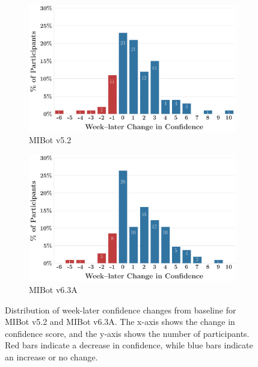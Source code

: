 \begin{figure}[htbp]
    \centering
    \begin{subfigure}[b]{0.48\textwidth}
        \centering
        \includegraphics[width=\textwidth]{fig/MIV5.2_ruler_deltas_delta_with_week_later_keep_high_conf_False_change.png}
        \caption{MIBot v5.2}
        \label{fig:confidence_v5.2}
    \end{subfigure}
    \hfill
    \begin{subfigure}[b]{0.48\textwidth}
        \centering
        \includegraphics[width=\textwidth]{fig/2024-11-14-MIV6.3A-2024-11-22-MIV6.3A_ruler_deltas_delta_with_week_later_keep_high_conf_False_change.png}
        \caption{MIBot v6.3A}
        \label{fig:confidence_v6.3}
    \end{subfigure}

    
    \caption[Confidence Change Distributions for MIBot v5.2 and v6.3A]{Distribution of week-later confidence changes from baseline for MIBot v5.2 and MIBot v6.3A. The x-axis shows the change in confidence score, and the y-axis shows the number of participants. Red bars indicate a decrease in confidence, while blue bars indicate an increase or no change.}
    \label{fig:confidence_distributions}
\end{figure}










